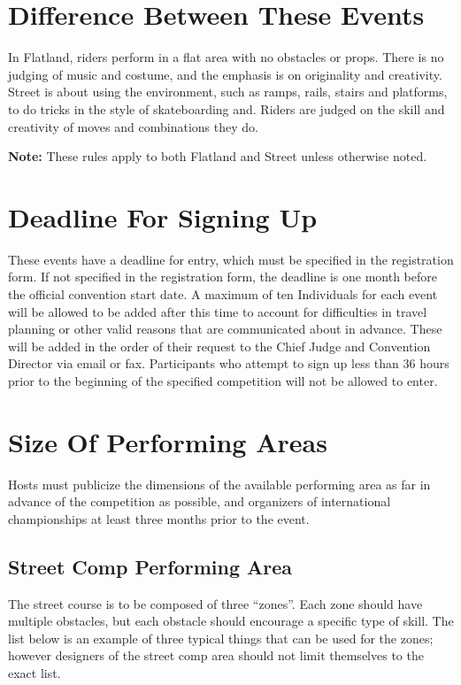 
\section{Difference Between These Events}
In Flatland, riders perform in a flat area with no obstacles or props.
There is no judging of music and costume, and the emphasis is on originality and creativity.
Street is about using the environment, such as ramps, rails, stairs and platforms, to do tricks in the style of skateboarding and.
Riders are judged on the skill and creativity of moves and combinations they do.

\textbf{Note:} These rules apply to both Flatland and Street unless otherwise noted.

\section{Deadline For Signing Up}
These events have a deadline for entry, which must be specified in the registration form.
If not specified in the registration form, the deadline is one month before the official convention start date.
A maximum of ten Individuals for each event will be allowed to be added after this time to account for difficulties in travel planning or other valid reasons that are communicated about in advance.
These will be added in the order of their request to the Chief Judge and Convention Director via email or fax.
Participants who attempt to sign up less than 36 hours prior to the beginning of the specified competition will not be allowed to enter.

\section{Size Of Performing Areas}
Hosts must publicize the dimensions of the available performing area as far in advance of the competition as possible, and organizers of international championships at least three months prior to the event.

\subsection{Street Comp Performing Area \label{subsec:flat-street_size-of-performing-area_street-comp}}
The street course is to be composed of three ``zones''.
Each zone should have multiple obstacles, but each obstacle should encourage a specific type of skill.
The list below is an example of three typical things that can be used for the zones; however designers of the street comp area should not limit themselves to the exact list.


